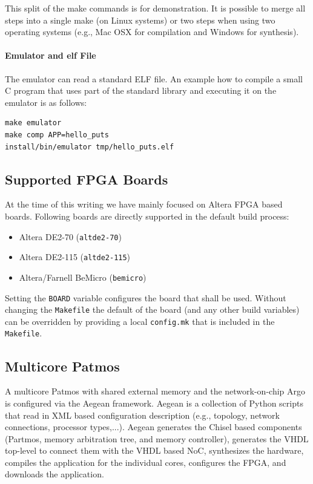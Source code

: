 \documentclass[a4paper,fontsize=10pt,twoside,DIV15,BCOR12mm,headinclude=true,footinclude=false,pagesize,bibtotoc]{scrbook}
\newcommand{\code}[1]{{\texttt{#1}}}
\newcommand{\comment}[3]{

\textsf{\textbf{#1}} {\color{#3}#2}}
\newcommand{\martin}[1]{\comment{Martin}{#1}{Blue}}
\renewcommand{\martin}[1]{}
\begin{document}
This split of the make commands is for demonstration. It is
possible to merge all steps into a single make (on Linux
systems) or two steps when using two operating
systems (e.g., Mac OSX for compilation and Windows for synthesis).

\paragraph{Emulator and elf File}

The emulator can read a standard ELF file. An example how to compile
a small C program that uses part of the standard library and executing
it on the emulator is as follows:

\begin{verbatim}
make emulator
make comp APP=hello_puts
install/bin/emulator tmp/hello_puts.elf
\end{verbatim}

\martin{Where is the make target to run the emulator with an ELF file?}

\subsection{Supported FPGA Boards}

At the time of this writing we have mainly focused on Altera FPGA based boards. Following boards
are directly supported in the default build process:

\begin{itemize}
\item Altera DE2-70 (\code{altde2-70})
\item Altera DE2-115 (\code{altde2-115})
\item Altera/Farnell BeMicro (\code{bemicro})
\end{itemize}

Setting the \code{BOARD} variable configures the board that shall be used.
Without changing the \code{Makefile} the default of the board (and any other build variables)
can be overridden by providing a local \code{config.mk} that is included in the \code{Makefile}.

\subsection{Multicore Patmos}

A multicore Patmos with shared external memory and the network-on-chip Argo is configured via
the Aegean framework. Aegean is a collection of Python scripts that read in XML based configuration
description (e.g., topology, network connections, processor types,...). Aegean generates the Chisel based
components (Partmos, memory arbitration tree, and memory controller), generates the VHDL top-level
to connect them with the VHDL based NoC, synthesizes the hardware, compiles the application for the
individual cores, configures the FPGA, and downloads the application.
\end{document}

